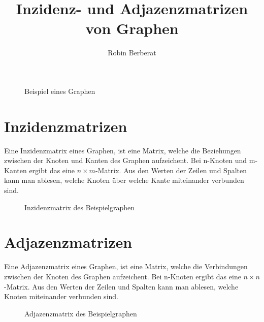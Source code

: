 \documentclass{article}
\begin{document}
    \title{Inzidenz- und Adjazenzmatrizen von Graphen}
    \author{Robin Berberat}
    \maketitle

    \begin{figure}[h]
        \centering
        \caption{Beispiel eines Graphen}
    \end{figure}

    \section{Inzidenzmatrizen}
    Eine Inzidenzmatrix eines Graphen, ist eine Matrix, welche die Beziehungen zwischen der Knoten und Kanten des Graphen aufzeichent.
    Bei n-Knoten und m-Kanten ergibt das eine \(n\times m\)-Matrix. Aus den Werten der Zeilen und Spalten kann man ablesen, welche Knoten \"uber welche Kante miteinander verbunden sind.
    \begin{figure}[h]
        \centering
        \caption{Inzidenzmatrix des Beispielgraphen}
    \end{figure}

    \section{Adjazenzmatrizen}
    Eine Adjazenzmatrix eines Graphen, ist eine Matrix, welche die Verbindungen zwischen der Knoten des Graphen aufzeichent.
    Bei n-Knoten ergibt das eine \(n\times n\)-Matrix. Aus den Werten der Zeilen und Spalten kann man ablesen, welche Knoten miteinander verbunden sind.

    \begin{figure}[h]
        \centering
        \caption{Adjazenzmatrix des Beispielgraphen}
    \end{figure}
\end{document}
